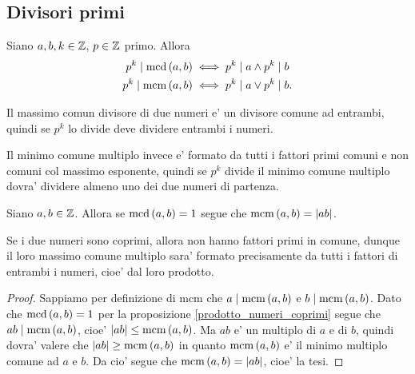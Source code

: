 \subsection{Divisori primi}
\begin{proposition}\label{mcd_mcm_in_termini_di_divisori_primi}
    Siano $a, b, k \in \mathbb{Z}$, $p \in \mathbb{Z}$ primo. Allora
    \begin{alignat}{1}
        p^k \mid \operatorname{mcd}\left(a, b\right) &\iff p^k \mid a \land p^k \mid b \\ 
        p^k \mid \operatorname{mcm}\left(a, b\right) &\iff p^k \mid a \lor p^k \mid b.
    \end{alignat}
\end{proposition}
\begin{intuition}
    Il massimo comun divisore di due numeri e' un divisore comune ad entrambi, quindi se $p^k$ lo divide deve dividere entrambi i numeri.

    Il minimo comune multiplo invece e' formato da tutti i fattori primi comuni e non comuni col massimo esponente, quindi se $p^k$ divide il minimo comune multiplo dovra' dividere almeno uno dei due numeri di partenza.
\end{intuition}

\begin{proposition}\label{mcm_equals_product}
    Siano $a, b \in \mathbb{Z}$. Allora se $\operatorname{mcd}\left(a, b\right) = 1$ segue che $\operatorname{mcm}\left(a, b\right) = \left|ab\right|$.
\end{proposition}
\begin{intuition}
    Se i due numeri sono coprimi, allora non hanno fattori primi in comune, dunque il loro massimo comune multiplo sara' formato precisamente da tutti i fattori di entrambi i numeri, cioe' dal loro prodotto.
\end{intuition}
\begin{proof}
    Sappiamo per definizione di mcm che $a \mid \operatorname{mcm}\left(a, b\right)$ e $b \mid \operatorname{mcm}\left(a, b\right)$. Dato che $\operatorname{mcd}\left(a, b\right) = 1$ per la proposizione \ref{prodotto_numeri_coprimi} segue che $ab \mid \operatorname{mcm}\left(a, b\right)$, cioe' $\left|ab\right| \leq \operatorname{mcm}\left(a, b\right)$. Ma $ab$ e' un multiplo di $a$ e di $b$, quindi dovra' valere che $\left|ab\right| \geq \operatorname{mcm}\left(a, b\right)$ in quanto $\operatorname{mcm}\left(a, b\right)$ e' il minimo multiplo comune ad $a$ e $b$. Da cio' segue che $\operatorname{mcm}\left(a, b\right) = \left|ab\right|$, cioe' la tesi.
\end{proof}

